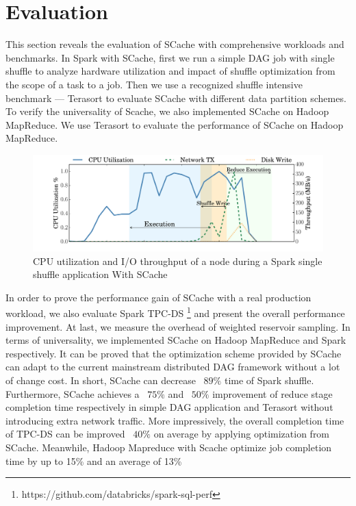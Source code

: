 \section{Evaluation}\label{evaluation}
This section reveals the evaluation of SCache with comprehensive workloads and benchmarks. 
{\color{blue}In Spark with SCache, }
first we run a simple DAG job with single shuffle to analyze hardware utilization and impact of shuffle optimization from the scope of a task to a job. 
Then we use a recognized shuffle intensive benchmark --- Terasort \cite{spark-tera} to evaluate SCache with different data partition schemes.
{\color{blue}To verify the universality of Scache, we also implemented SCache on Hadoop MapReduce. We use Terasort to evaluate the performance of SCache on Hadoop MapReduce.}

\begin{figure}
	\includegraphics[width=\linewidth]{fig/scache_util}
	\caption{CPU utilization and I/O throughput of a node during a Spark single shuffle application With SCache}
	\label{fig:scache_util}
\end{figure}

In order to prove the performance gain of SCache with a real production workload, we also evaluate Spark TPC-DS \footnote{https://github.com/databricks/spark-sql-perf} and present the overall performance improvement.
At last, we measure the overhead of weighted reservoir sampling. 
{\color{blue}In terms of universality, we implemented SCache on Hadoop MapReduce and Spark respectively. It can be proved that the optimization scheme provided by SCache can adapt to the current mainstream distributed DAG framework without a lot of change cost.}
In short, SCache can decrease ~$89\%$ time of Spark shuffle. Furthermore, SCache achieves a ~$75\%$ and ~$50\%$ improvement of reduce stage completion time respectively in simple DAG application and Terasort without introducing extra network traffic. More impressively, the overall completion time of TPC-DS can be improved ~$40\%$ on average by applying optimization from SCache.
{\color{blue}Meanwhile, Hadoop Mapreduce with Scache optimize job completion time by up to 15\% and an average of 13\%}

